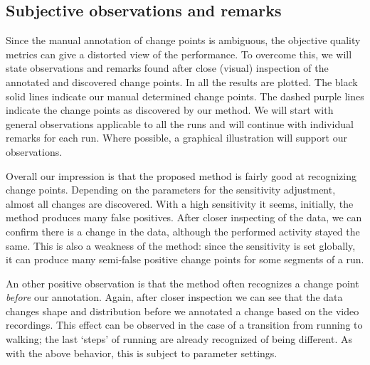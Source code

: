 \subsection{Subjective observations and remarks}
Since the manual annotation of change points is ambiguous, the objective quality metrics can give a distorted view of the performance.
To overcome this, we will state observations and remarks found after close (visual) inspection of the annotated and discovered change points.
In  all the results are plotted.
The black solid lines indicate our manual determined change points.
The dashed purple lines indicate the change points as discovered by our method.
We will start with general observations applicable to all the runs and will continue with individual remarks for each run.
Where possible, a graphical illustration will support our observations.

Overall our impression is that the proposed method is fairly good at recognizing change points.
Depending on the parameters for the sensitivity adjustment, almost all changes are discovered.
With a high sensitivity it seems, initially, the method produces many false positives.
After closer inspecting of the data, we can confirm there is a change in the data, although the performed activity stayed the same.
This is also a weakness of the method: since the sensitivity is set globally, it can produce many semi-false positive change points for some segments of a run.

An other positive observation is that the method often recognizes a change point \emph{before} our annotation.
Again, after closer inspection we can see that the data changes shape and distribution before we annotated a change based on the video recordings.
This effect can be observed in the case of a transition from running to walking; the last `steps' of running are already recognized of being different.
As with the above behavior, this is subject to parameter settings.

